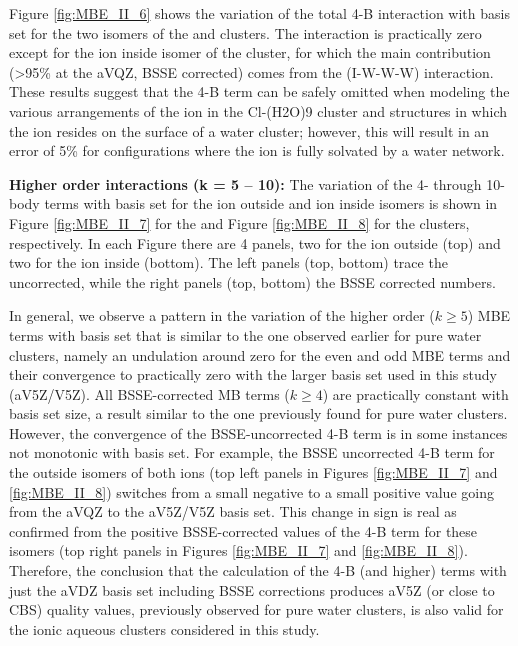 \documentclass[11pt, proquest]{uwthesis}[2020/02/24]
\let\ce\ch
\newcommand{\textapprox}{\raisebox{0.5ex}{\texttildelow}}
\begin{document}


\par Figure \ref{fig:MBE_II_6} shows the variation of the total 4-B interaction with basis set for the two isomers of the \ce{Li^+(H2O)9} and \ce{Cl^-(H2O)9} clusters. The interaction is practically zero except for the ion inside isomer of the \ce{Li^+(H2O)9} cluster, for which the main contribution (\textgreater 95\% at the aVQZ, BSSE corrected) comes from the (I-W-W-W) interaction. These results suggest that the 4-B term can be safely omitted when modeling the various arrangements of the ion in the Cl-(H2O)9 cluster and structures in which the \ce{Li^+} ion resides on the surface of a water cluster; however, this will result in an error of \textapprox5\% for configurations where the \ce{Li^+} ion is fully solvated by a water network.


\textbf{Higher order interactions (k = 5 – 10):} The variation of the 4- through 10-body terms with basis set for the ion outside and ion inside isomers is shown in Figure \ref{fig:MBE_II_7} for the \ce{Li^+(H2O)9} and Figure \ref{fig:MBE_II_8} for the \ce{Cl^-(H2O)9} clusters, respectively. In each Figure there are 4 panels, two for the ion outside (top) and two for the ion inside (bottom). The left panels (top, bottom) trace the uncorrected, while the right panels (top, bottom) the BSSE corrected numbers.

\par In general, we observe a pattern in the variation of the higher order ($k \geq 5$) MBE terms with basis set that is similar to the one observed earlier for pure water clusters,\autocite{heindel_many-body_2020} namely an undulation around zero for the even and odd MBE terms and their convergence to practically zero with the larger basis set used in this study (aV5Z/V5Z). All BSSE-corrected MB terms ($k \geq 4$) are practically constant with basis set size, a result similar to the one previously found for pure water clusters.\autocite{heindel_many-body_2020} However, the convergence of the BSSE-uncorrected 4-B term is in some instances not monotonic with basis set. For example, the BSSE uncorrected 4-B term for the outside isomers of both ions (top left panels in Figures \ref{fig:MBE_II_7} and \ref{fig:MBE_II_8}) switches from a small negative to a small positive value going from the aVQZ to the aV5Z/V5Z basis set. This change in sign is real as confirmed from the positive BSSE-corrected values of the 4-B term for these isomers (top right panels in Figures \ref{fig:MBE_II_7} and \ref{fig:MBE_II_8}). Therefore, the conclusion that the calculation of the 4-B (and higher) terms with just the aVDZ basis set including BSSE corrections produces aV5Z (or close to CBS) quality values, previously observed for pure water clusters,\autocite{heindel_many-body_2020} is also valid for the ionic aqueous clusters considered in this study.

\end{document}
